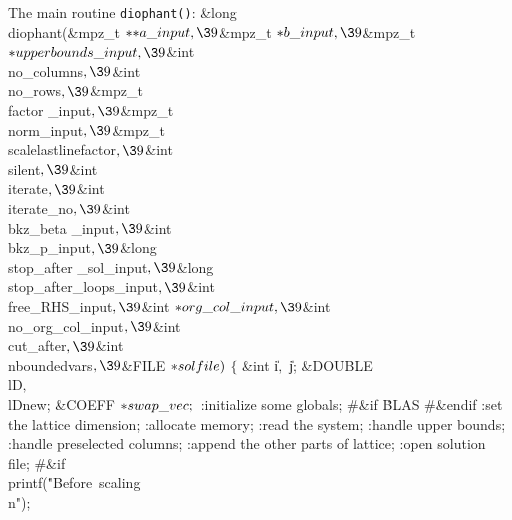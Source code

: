 The main routine {\tt diophant()}:
\Y\B\&{long} \\{diophant}(\&{mpz\_t} ${}{*}{*}\\{a\_input},\39{}$\&{mpz\_t}
${}{*}\\{b\_input},\39{}$\&{mpz\_t} ${}{*}\\{upperbounds\_input},\39{}$\&{int} %
\\{no\_columns}${},\39{}$\&{int} \\{no\_rows}${},\39{}$\&{mpz\_t} \\{factor%
\_input}${},\39{}$\&{mpz\_t} \\{norm\_input}${},\39{}$\&{mpz\_t} %
\\{scalelastlinefactor}${},\39{}$\&{int} \\{silent}${},\39{}$\&{int} %
\\{iterate}${},\39{}$\&{int} \\{iterate\_no}${},\39{}$\&{int} \\{bkz\_beta%
\_input}${},\39{}$\&{int} \\{bkz\_p\_input}${},\39{}$\&{long} \\{stop\_after%
\_sol\_input}${},\39{}$\&{long} \\{stop\_after\_loops\_input}${},\39{}$\&{int} %
\\{free\_RHS\_input}${},\39{}$\&{int} ${}{*}\\{org\_col\_input},\39{}$\&{int} %
\\{no\_org\_col\_input}${},\39{}$\&{int} \\{cut\_after}${},\39{}$\&{int} %
\\{nboundedvars}${},\39{}$\&{FILE} ${}{*}\\{solfile}){}$\7
${}\{{}$\1\6
\&{int} \|i${},{}$ \|j;\6
\&{DOUBLE} \\{lD}${},{}$ \\{lDnew};\6
\&{COEFF} ${}{*}\\{swap\_vec};{}$\7
:initialize some globals\X;\6
\8\#\&{if} \.{BLAS}\6
\8\#\&{endif}\6
:set the lattice dimension\X;\6
:allocate memory\X;\6
:read the system\X;\6
:handle upper bounds\X;\6
:handle preselected columns\X;\6
:append the other parts of lattice\X;\6
:open solution file\X;\6
\8\#\&{if} \6
\\{printf}(\.{"Before\ scaling\\n"});\6
